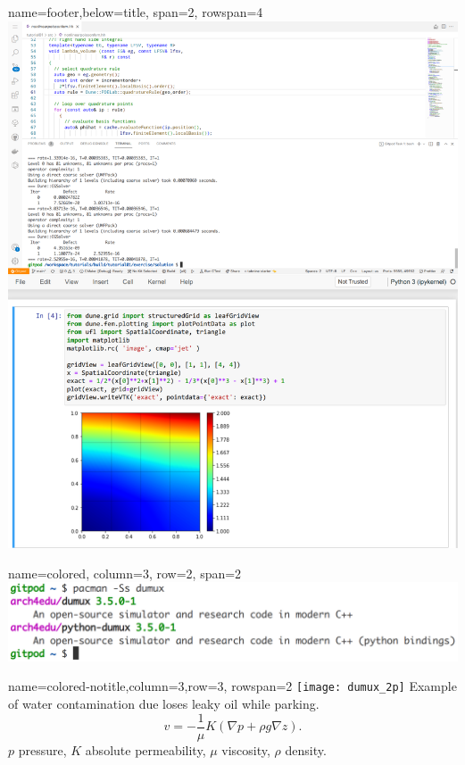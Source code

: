 \documentclass[
	paper=a0,
	style=ruled, %
	]{bfhsciposter}
\begin{document}
\begin{tcbposter}[
		poster={
				columns=4,
				rows=7,
				spacing=1cm,
			},]
	\begin{posterboxenv}[BFH-framed,title=Tutorials available on Gitpod
		\\
		\url{https://cpp-review-dune.github.io/tutorial}]{name=footer,below=title, span=2, rowspan=4}
		\includegraphics[width=\linewidth]{gitpod_dune}
	\end{posterboxenv}

	\begin{posterboxenv}[title=C++ Review DUNE meets Arch Linux Repository for Education, BFH-framed]{name=colored, column=3, row=2, span=2}
		\includegraphics[width=\linewidth]{arch4edu_gitpod}
	\end{posterboxenv}

	\begin{posterboxenv}{name=colored-notitle,column=3,row=3, rowspan=2}
		\texttt{[image: dumux\_2p]}
		Example of water contamination due loses leaky oil while parking.
		\[
			v=
			-\frac{1}{\mu}
			K
			\left(\nabla p+\rho g \nabla z\right).
		\]
		$p$ pressure, $K$ absolute permeability,
		$\mu$ viscosity, $\rho$ density.
	\end{posterboxenv}


\end{tcbposter}
\end{document}
